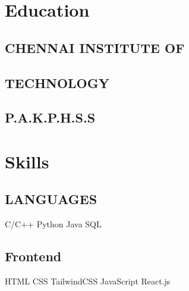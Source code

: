 \begin{minipage}[t]{0.33\textwidth} 


\section{Education} 

\subsection{CHENNAI INSTITUTE OF}
\subsection{TECHNOLOGY}


\sectionsep

\subsection{P.A.K.P.H.S.S}
\sectionsep




\section{Skills}

\subsection{LANGUAGES}

\textbullet{} C/C++
\textbullet{} Python 
\textbullet{} Java 
\textbullet{} SQL


\vspace{\topsep} %

\subsection{Frontend}
\textbullet{} HTML
\textbullet{} CSS 
\textbullet{} TailwindCSS
\textbullet{} JavaScript
\textbullet{} React.js 



\end{minipage}
